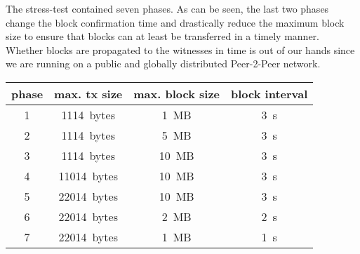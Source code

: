 The stress-test contained seven phases. As can be seen, the last two phases
change the block confirmation time and drastically reduce the maximum block
size to ensure that blocks can at least be transferred in a timely manner.
Whether blocks are propagated to the witnesses in time is out of our hands
since we are running on a public and globally distributed Peer-2-Peer network.

\begin{tabular}{c|c|c|c}
 \textbf{phase} & \textbf{max. tx size} & \textbf{max. block size} & \textbf{block interval} \\\hline
 1 & \SI{1114}{bytes}  & \SI{1}{MB}  & \SI{3}{s} \\
 2 & \SI{1114}{bytes}  & \SI{5}{MB}  & \SI{3}{s} \\
 3 & \SI{1114}{bytes}  & \SI{10}{MB} & \SI{3}{s} \\
 4 & \SI{11014}{bytes} & \SI{10}{MB} & \SI{3}{s} \\
 5 & \SI{22014}{bytes} & \SI{10}{MB} & \SI{3}{s} \\
 6 & \SI{22014}{bytes} & \SI{2}{MB}  & \SI{2}{s} \\
 7 & \SI{22014}{bytes} & \SI{1}{MB}  & \SI{1}{s} \\\hline
\end{tabular}
